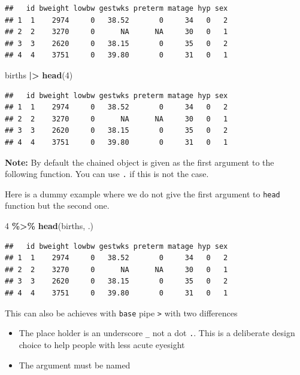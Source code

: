 \documentclass[
]{book}
\newenvironment{Shaded}{\begin{snugshade}}{\end{snugshade}}
\newcommand{\DecValTok}[1]{\textcolor[rgb]{0.00,0.00,0.81}{#1}}
\newcommand{\FunctionTok}[1]{\textcolor[rgb]{0.13,0.29,0.53}{\textbf{#1}}}
\newcommand{\NormalTok}[1]{#1}
\newcommand{\SpecialCharTok}[1]{\textcolor[rgb]{0.81,0.36,0.00}{\textbf{#1}}}
\providecommand{\tightlist}{%
  \setlength{\itemsep}{0pt}\setlength{\parskip}{0pt}}
\theoremstyle{definition}
\theoremstyle{definition}
\theoremstyle{definition}
\theoremstyle{definition}
\theoremstyle{remark}
\begin{document}
\begin{verbatim}
##   id bweight lowbw gestwks preterm matage hyp sex
## 1  1    2974     0   38.52       0     34   0   2
## 2  2    3270     0      NA      NA     30   0   1
## 3  3    2620     0   38.15       0     35   0   2
## 4  4    3751     0   39.80       0     31   0   1
\end{verbatim}

\begin{Shaded}
\begin{Highlighting}[]
\NormalTok{births }\SpecialCharTok{|\textgreater{}} \FunctionTok{head}\NormalTok{(}\DecValTok{4}\NormalTok{)}
\end{Highlighting}
\end{Shaded}

\begin{verbatim}
##   id bweight lowbw gestwks preterm matage hyp sex
## 1  1    2974     0   38.52       0     34   0   2
## 2  2    3270     0      NA      NA     30   0   1
## 3  3    2620     0   38.15       0     35   0   2
## 4  4    3751     0   39.80       0     31   0   1
\end{verbatim}

\textbf{Note:} By default the chained object is given as the first argument to the following
function.
You can use \texttt{.} if this is not the case.

Here is a dummy example where we do not give the first argument to \texttt{head} function but the second one.

\begin{Shaded}
\begin{Highlighting}[]
\DecValTok{4} \SpecialCharTok{\%\textgreater{}\%} \FunctionTok{head}\NormalTok{(births, .)}
\end{Highlighting}
\end{Shaded}

\begin{verbatim}
##   id bweight lowbw gestwks preterm matage hyp sex
## 1  1    2974     0   38.52       0     34   0   2
## 2  2    3270     0      NA      NA     30   0   1
## 3  3    2620     0   38.15       0     35   0   2
## 4  4    3751     0   39.80       0     31   0   1
\end{verbatim}

This can also be achieves with \texttt{base} pipe \texttt{\textbar{}\textgreater{}} with two differences

\begin{itemize}
\tightlist
\item
  The place holder is an underscore \texttt{\_} not a dot \texttt{.}. This is a deliberate design choice to help people with less acute eyesight
\item
  The argument must be named
\end{itemize}
\end{document}
